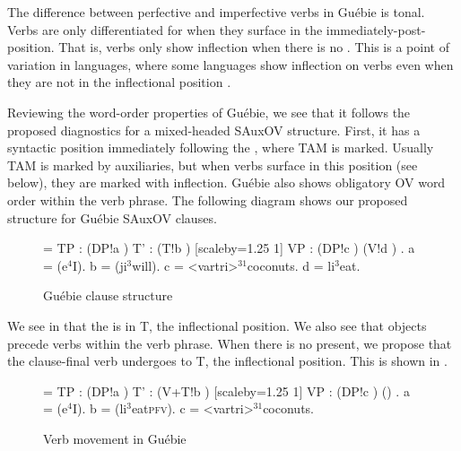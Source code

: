 \documentclass[output=paper]{LSP/langsci}
\begin{document}
The difference between perfective and imperfective verbs in Gu\'ebie is tonal. Verbs are only differentiated for  when they surface in the immediately-post- position. That is, verbs only show inflection when there is no . This is a point of variation in  languages, where some languages show inflection on verbs even when they are not in the inflectional position \citep{Marchese1979,Koopman:1984}.

Reviewing the word-order properties of Gu\'ebie, we see that it follows the proposed diagnostics for a mixed-headed SAuxOV structure. First, it has a syntactic  position immediately following the , where TAM is marked. Usually TAM is marked by auxiliaries, but when verbs surface in this position (see below), they are marked with inflection. Gu\'ebie also shows obligatory OV word order within the verb phrase. The following diagram shows our proposed structure for Gu\'ebie SAuxOV clauses.

\begin{figure}
\jtree[xunit=2.5em,yunit=1.25em]
\! = {TP}
: ({DP}!a ) {T'}
: ({T}!b ) [scaleby=1.25 1] {VP}
: ({DP}!c ) ({V}!d ) .
\!a = ({e$^{4}$}{I}).
\!b = ({ji$^{3}$}{will}).
\!c = <vartri>{$^{31}$}{coconuts}.
\!d = {li$^{3}$}{eat}.
\endjtree
\caption{Gu\'ebie clause structure \citep[cf.][]{Sande:2014}} \label{fig:sande:Guebie}
\end{figure}

We see in  that the  is in T, the inflectional position. We also see that objects precede verbs within the verb phrase. %
When there is no  present, we propose that the clause-final verb undergoes  to T, the inflectional position. This is shown in .

\begin{figure} 
	
\jtree[xunit=2.5em,yunit=1.25em]
\! = {TP}
: ({DP}!a ) {T'}
: ({V+T}!b ) [scaleby=1.25 1] {VP}
: ({DP}!c ) ({}) .
\!a = ({e$^{4}$}{I}).
\!b = ({li$^{3}$}{eat\textsc{pfv}}).
\!c = <vartri>{$^{31}$}{coconuts}.
 \hspace{12pt}
\endjtree
\caption{Verb movement in Gu\'ebie \citep[cf.][]{Koopman:1984, Sande:2014}} \label{fig:sande:Guebieverbmove}
\end{figure}
\end{document}
